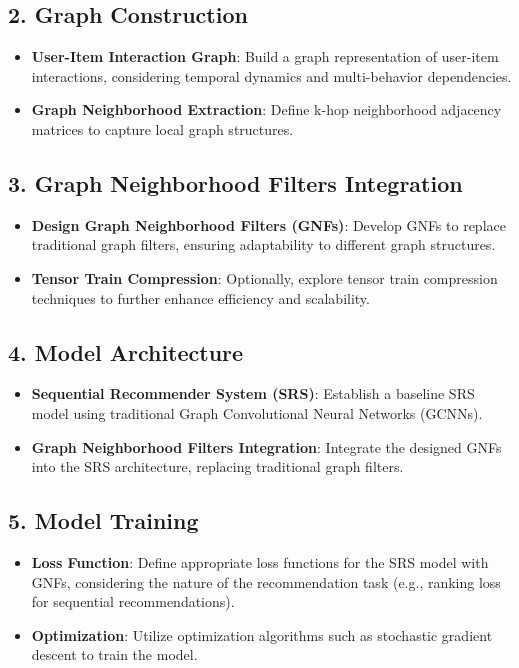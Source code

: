 \documentclass[journal]{IEEEtran}
\begin{document}
\subsection*{2. Graph Construction}

\begin{itemize}
  \item \textbf{User-Item Interaction Graph}: Build a graph representation of user-item interactions, considering temporal dynamics and multi-behavior dependencies.
  \item \textbf{Graph Neighborhood Extraction}: Define k-hop neighborhood adjacency matrices to capture local graph structures.
\end{itemize}

\subsection*{3. Graph Neighborhood Filters Integration}

\begin{itemize}
  \item \textbf{Design Graph Neighborhood Filters (GNFs)}: Develop GNFs to replace traditional graph filters, ensuring adaptability to different graph structures.
  \item \textbf{Tensor Train Compression}: Optionally, explore tensor train compression techniques to further enhance efficiency and scalability.
\end{itemize}

\subsection*{4. Model Architecture}

\begin{itemize}
  \item \textbf{Sequential Recommender System (SRS)}: Establish a baseline SRS model using traditional Graph Convolutional Neural Networks (GCNNs).
  \item \textbf{Graph Neighborhood Filters Integration}: Integrate the designed GNFs into the SRS architecture, replacing traditional graph filters.
\end{itemize}

\subsection*{5. Model Training}

\begin{itemize}
  \item \textbf{Loss Function}: Define appropriate loss functions for the SRS model with GNFs, considering the nature of the recommendation task (e.g., ranking loss for sequential recommendations).
  \item \textbf{Optimization}: Utilize optimization algorithms such as stochastic gradient descent to train the model.
\end{itemize}
\end{document}

